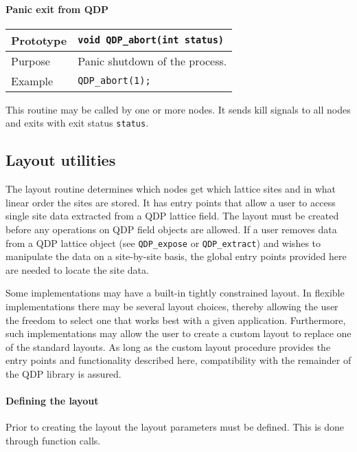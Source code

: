 \documentclass{article}
\begin{document}
\paragraph{Panic exit from QDP}

\begin{flushleft}
  \begin{tabular}{|l|l|}
  \hline
  Prototype      & \verb|void QDP_abort(int status)|\\
    \hline
  Purpose        & Panic shutdown of the process. \\
\hline
  Example  & \verb|QDP_abort(1);| \\
   \hline
 \end{tabular}
\end{flushleft}
%
This routine may be called by one or more nodes.  It sends kill
signals to all nodes and exits with exit status \verb|status|.

\subsection{Layout utilities}

The layout routine determines which nodes get which lattice sites and
in what linear order the sites are stored.  It has entry points that
allow a user to access single site data extracted from a QDP lattice
field.  The layout must be created before any operations on QDP field
objects are allowed.  If a user removes data from a QDP lattice object
(see \verb|QDP_expose| or \verb|QDP_extract|) and wishes to manipulate
the data on a site-by-site basis, the global entry points provided
here are needed to locate the site data.

Some implementations may have a built-in tightly constrained layout.
In flexible implementations there may be several layout choices,
thereby allowing the user the freedom to select one that works best
with a given application.  Furthermore, such implementations may allow
the user to create a custom layout to replace one of the standard
layouts.  As long as the custom layout procedure provides the entry
points and functionality described here, compatibility with the
remainder of the QDP library is assured.

\paragraph{Defining the layout}

Prior to creating the layout the layout parameters must be defined.
This is done through function calls.
\end{document}
